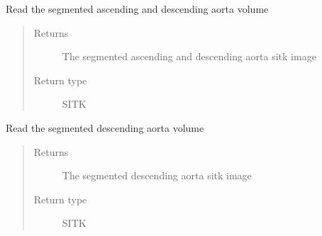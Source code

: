 \documentclass[letterpaper,10pt,english]{sphinxmanual}
\begin{document}
\begin{fulllineitems}
\label{\detokenize{test:test_image_preprocessing.print_result}}
\end{fulllineitems}


\begin{fulllineitems}
\label{\detokenize{test:test_image_preprocessing.read_asc_volume_image}}
\sphinxAtStartPar
Read the segmented ascending and descending aorta volume
\begin{quote}\begin{description}
\item[{Returns}] \leavevmode
\sphinxAtStartPar
The segmented ascending and descending aorta sitk image

\item[{Return type}] \leavevmode
\sphinxAtStartPar
SITK

\end{description}\end{quote}

\end{fulllineitems}


\begin{fulllineitems}
\label{\detokenize{test:test_image_preprocessing.read_desc_volume_image}}
\sphinxAtStartPar
Read the segmented descending aorta volume
\begin{quote}\begin{description}
\item[{Returns}] \leavevmode
\sphinxAtStartPar
The segmented descending aorta sitk image

\item[{Return type}] \leavevmode
\sphinxAtStartPar
SITK

\end{description}\end{quote}

\end{fulllineitems}
\end{document}

